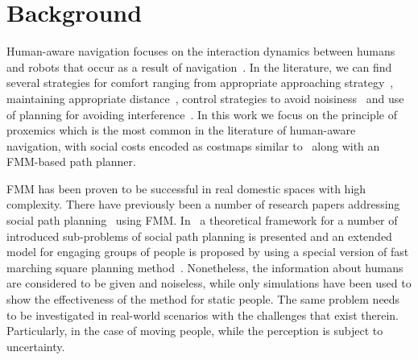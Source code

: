 \section{Background}
\label{Literature}


Human-aware navigation focuses on the interaction dynamics between humans and robots that occur as a result of navigation~\cite{Kruse2013}. 
In the literature, we can find several strategies for comfort ranging from appropriate approaching strategy~\cite{Dautenhahn2006}, maintaining appropriate distance~\cite{Takayama2009}, control strategies to avoid noisiness~\cite{Martinson2007} and use of planning for avoiding interference~\cite{Vasquez2012}. In this work we focus on the principle of proxemics which is the most common in the literature of human-aware navigation, with social costs encoded as costmaps similar to~\cite{gomez2013social} along with an FMM-based path planner.



FMM has been proven to be successful in real domestic spaces with high complexity\cite{ventura2015}. There have previously been a number of research papers addressing social path planning~\cite{gomez2014fast,gomez2013social} using FMM. %
In~\cite{gomez2014fast} a theoretical framework for a number of introduced sub-problems of social path planning is presented and an extended model for engaging groups of people is proposed by using a special version of fast marching square planning method~\cite{valero2013fast}. Nonetheless, the information about humans are considered to be given and noiseless, while only simulations have been used to show the effectiveness of the method for static people. The same problem needs to be investigated in real-world scenarios with the challenges that exist therein. Particularly, in the case of moving people, while the perception is subject to uncertainty. 



